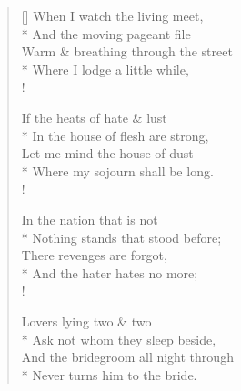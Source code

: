 \documentclass[MAIN]{subfiles}
\begin{document}
\settowidth{\versewidth}{This feast-day of the sun, his altar there}
\begin{verse}[\versewidth]
When I watch the living meet,\\*
\vin And the moving pageant file\\
Warm \& breathing through the street\\*
\vin Where I lodge a little while,\\!

If the heats of hate \& lust\\*
\vin In the house of flesh are strong,\\
Let me mind the house of dust\\*
\vin Where my sojourn shall be long.\\!

In the nation that is not\\*
\vin Nothing stands that stood before;\\
There revenges are forgot,\\*
\vin And the hater hates no more;\\!

Lovers lying two \& two\\*
\vin Ask not whom they sleep beside,\\
And the bridegroom all night through\\*
\vin Never turns him to the bride.
\end{verse}
\end{document}
